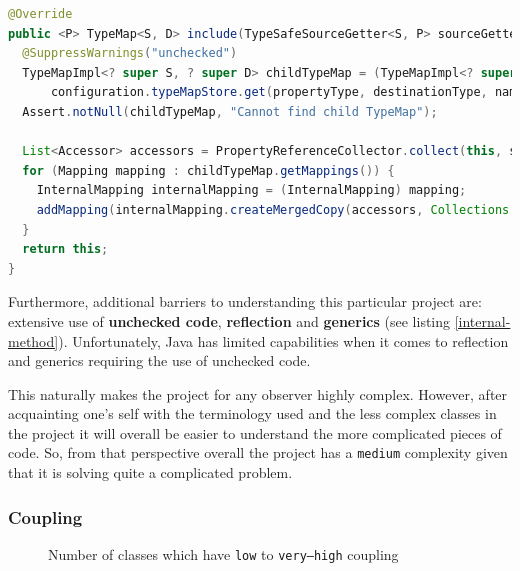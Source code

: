\documentclass[12pt]{article}
\begin{document}
\begin{lstlisting}[language=Java,label={internal-method},caption={An
internal method in the class \texttt{TypeMapImpl} which
was reported by CodeMR as having \texttt{very--high}
complexity}]
@Override
public <P> TypeMap<S, D> include(TypeSafeSourceGetter<S, P> sourceGetter, Class<P> propertyType) {
  @SuppressWarnings("unchecked")
  TypeMapImpl<? super S, ? super D> childTypeMap = (TypeMapImpl<? super S, ? super D>)
      configuration.typeMapStore.get(propertyType, destinationType, name);
  Assert.notNull(childTypeMap, "Cannot find child TypeMap");

  List<Accessor> accessors = PropertyReferenceCollector.collect(this, sourceGetter);
  for (Mapping mapping : childTypeMap.getMappings()) {
    InternalMapping internalMapping = (InternalMapping) mapping;
    addMapping(internalMapping.createMergedCopy(accessors, Collections.<PropertyInfo>emptyList()));
  }
  return this;
}
\end{lstlisting}

Furthermore, additional barriers to understanding this
particular project are: extensive use of \textbf{unchecked
code}, \textbf{reflection} and \textbf{generics} (see listing
\ref{internal-method}). Unfortunately, Java has limited
capabilities when it comes to reflection and generics requiring
the use of unchecked code.

This naturally makes the project for any observer highly
complex. However, after acquainting one's self with the
terminology used and the less complex classes in the project it
will overall be easier to understand the more complicated pieces
of code. So, from that perspective overall the project has a
\texttt{medium} complexity given that it is solving quite a
complicated problem. 

\subsubsection{Coupling}

\begin{figure}[H]
    \centering
    \caption{Number of classes which have \texttt{low} to
    \texttt{very--high} coupling}
\end{figure}
\end{document}
